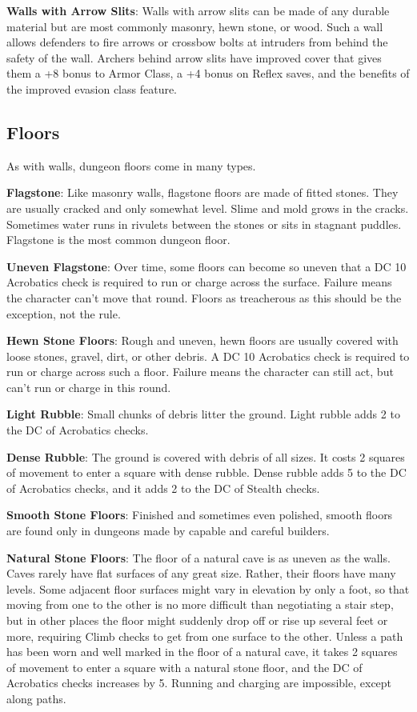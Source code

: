 \textbf{Walls with Arrow Slits}: Walls with arrow slits can be made of any durable material but are most commonly masonry, hewn stone, or wood. Such a wall allows defenders to fire arrows or crossbow bolts at intruders from behind the safety of the wall. Archers behind arrow slits have improved cover that gives them a +8 bonus to Armor Class, a +4 bonus on Reflex saves, and the benefits of the improved evasion class feature.
				
\subsection{Floors}

				
As with walls, dungeon floors come in many types.
				
\textbf{Flagstone}: Like masonry walls, flagstone floors are made of fitted stones. They are usually cracked and only somewhat level. Slime and mold grows in the cracks. Sometimes water runs in rivulets between the stones or sits in stagnant puddles. Flagstone is the most common dungeon floor.
				
\textbf{Uneven Flagstone}: Over time, some floors can become so uneven that a DC 10 Acrobatics check is required to run or charge across the surface. Failure means the character can't move that round. Floors as treacherous as this should be the exception, not the rule.
				
\textbf{Hewn Stone Floors}: Rough and uneven, hewn floors are usually covered with loose stones, gravel, dirt, or other debris. A DC 10 Acrobatics check is required to run or charge across such a floor. Failure means the character can still act, but can't run or charge in this round.
				
\textbf{Light Rubble}: Small chunks of debris litter the ground. Light rubble adds 2 to the DC of Acrobatics checks.
				
\textbf{Dense Rubble}: The ground is covered with debris of all sizes. It costs 2 squares of movement to enter a square with dense rubble. Dense rubble adds 5 to the DC of Acrobatics checks, and it adds 2 to the DC of Stealth checks.
				
\textbf{Smooth Stone Floors}: Finished and sometimes even polished, smooth floors are found only in dungeons made by capable and careful builders. 
				
\textbf{Natural Stone Floors}: The floor of a natural cave is as uneven as the walls. Caves rarely have flat surfaces of any great size. Rather, their floors have many levels. Some adjacent floor surfaces might vary in elevation by only a foot, so that moving from one to the other is no more difficult than negotiating a stair step, but in other places the floor might suddenly drop off or rise up several feet or more, requiring Climb checks to get from one surface to the other. Unless a path has been worn and well marked in the floor of a natural cave, it takes 2 squares of movement to enter a square with a natural stone floor, and the DC of Acrobatics checks increases by 5. Running and charging are impossible, except along paths.
				
